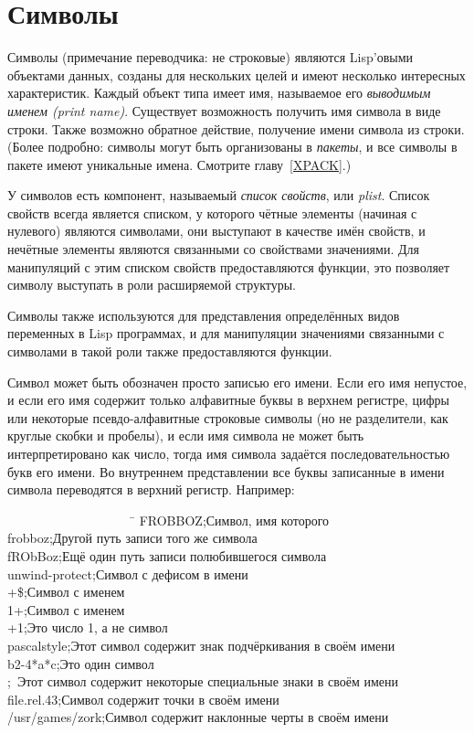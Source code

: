 \section{Символы}

Символы (примечание переводчика: не строковые) являются Lisp'овыми объектами данных,
созданы для нескольких целей и имеют несколько интересных характеристик. Каждый
объект типа  имеет имя, называемое его \emph{выводимым именем (print
  name)}. Существует возможность получить имя символа в виде строки. Также
возможно обратное действие, получение имени символа из строки. (Более подробно:
символы могут быть организованы в \emph{пакеты}, и все символы в пакете имеют
уникальные имена. Смотрите главу~\ref{XPACK}.)

У символов есть компонент, называемый \emph{список свойств}, или \emph{plist}.
Список свойств всегда является списком, у которого чётные элементы (начиная с
нулевого) являются символами, они выступают в качестве имён свойств, и нечётные
элементы являются связанными со свойствами значениями. Для манипуляций с этим
списком свойств предоставляются функции, это позволяет символу выступать в роли
расширяемой структуры.

Символы также используются для представления определённых видов переменных в
Lisp программах, и для манипуляции значениями связанными с символами в такой
роли также предоставляются функции.

Символ может быть обозначен просто записью его имени.
Если его имя непустое, и если его имя содержит только алфавитные буквы в верхнем
регистре, цифры или некоторые псевдо-алфавитные строковые символы (но не
разделители, как круглые скобки и пробелы), и если имя символа не может быть
интерпретировано как число, тогда имя символа задаётся последовательностью букв
его имени.
Во внутреннем представлении все буквы записанные в имени символа переводятся в
верхний регистр.
Например:
\begin{lisp}
~~~~~~~~~~~~~~~~~~~~\=\kill
FROBBOZ\>;\textrm{Символ, имя которого } \\
frobboz\>;\textrm{Другой путь записи того же символа} \\
fRObBoz\>;\textrm{Ещё один путь записи полюбившегося символа} \\
unwind-protect\>;\textrm{Символ с дефисом в имени} \\
+\$\>;\textrm{Символ с именем \cd{+\$}} \\
1+\>;\textrm{Символ с именем } \\
+1\>;\textrm{Это число 1, а не символ} \\
pascal{\Xunderscore}style\>;\textrm{Этот символ содержит знак подчёркивания в своём
  имени} \\
b{\Xcircumflex}2-4*a*c\>;\textrm{Это один символ} \\
\>;~\textrm{Этот символ содержит некоторые специальные знаки в своём имени} \\
file.rel.43\>;\textrm{Символ содержит точки в своём имени} \\
/usr/games/zork\>;\textrm{Символ содержит наклонные черты в своём имени}
\end{lisp}

